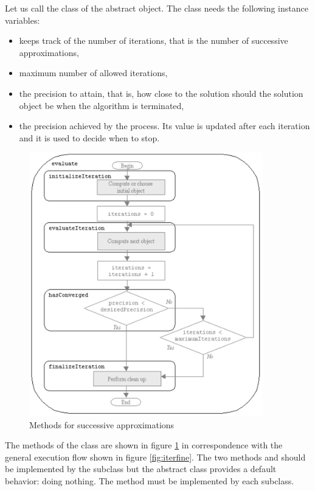 Let us call  the class of the abstract
object. The class  needs the following
instance variables:
\begin{itemize}
\item {}keeps track of the number of iterations, that is the number of successive
approximations,
\item {} maximum number of allowed iterations,
\item {} the precision to attain, that is, how close to the solution should the solution object be when the algorithm is
terminated,
\item {} the precision achieved by the process. Its value is updated after each iteration and it is used to decide when to stop.
\end{itemize}
\begin{figure}
\centering\includegraphics[width=4in]{Figures/IterationMethods}
\caption{Methods for successive
approximations}\label{fig:itermeth}
\end{figure}
The methods of the class  are shown in
figure \ref{fig:itermeth} in correspondence with the general
execution flow shown in figure \ref{fig:iterfine}. The two methods
 and  should be
implemented by the subclass but the abstract class provides a
default behavior: doing nothing. The method  must be implemented by each subclass.

